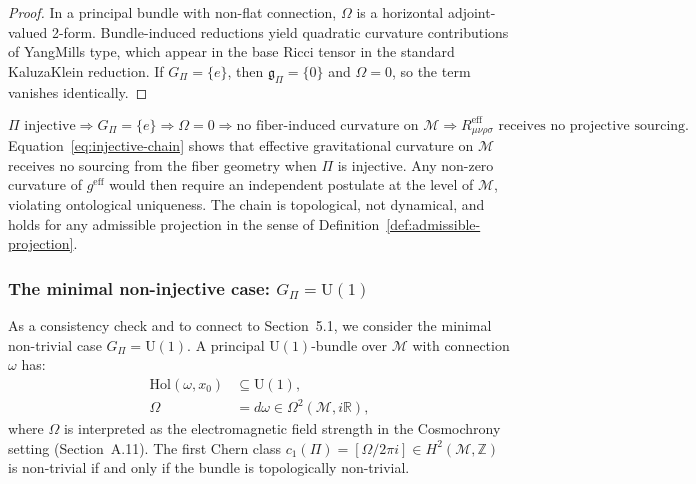     \begin{proof}
      In a principal bundle with non-flat connection, $\Omega$ is a horizontal adjoint-valued 2-form.
      Bundle-induced reductions yield quadratic curvature contributions of Yang\textendash Mills type,
      which appear in the base Ricci tensor in the standard Kaluza\textendash Klein reduction.
      If $G_\Pi = \{e\}$, then $\mathfrak{g}_\Pi = \{0\}$ and $\Omega = 0$, so the term vanishes identically.
    \end{proof}

    \begin{remark}
      \begin{equation}
        \Pi \text{ injective}
        \Rightarrow
        G_\Pi = \{e\}
        \Rightarrow
        \Omega = 0
        \Rightarrow
        \text{no fiber-induced curvature on } \mathcal{M}
        \Rightarrow
        R^\mathrm{eff}_{\mu\nu\rho\sigma}
        \text{ receives no projective sourcing.}
        \label{eq:injective-chain}
      \end{equation}
      Equation~\eqref{eq:injective-chain} shows that effective gravitational curvature on $\mathcal{M}$
      receives no sourcing from the fiber geometry when $\Pi$ is injective.
      Any non-zero curvature of $g^\mathrm{eff}$ would then require an independent postulate at the level of $\mathcal{M}$,
      violating ontological uniqueness.
      The chain is topological, not dynamical, and holds for any admissible projection in the sense of
      Definition~\ref{def:admissible-projection}.
    \end{remark}

  \subsubsection*{The minimal non-injective case: $G_\Pi = \mathrm{U}(1)$}
    \label{subsec:stepA-minimal}

    As a consistency check and to connect to Section~5.1, we consider the minimal non-trivial case $G_\Pi = \mathrm{U}(1)$.
    A principal $\mathrm{U}(1)$-bundle over $\mathcal{M}$ with connection $\omega$ has:
    \begin{align}
      \mathrm{Hol}(\omega, x_0) &\subseteq \mathrm{U}(1), \\
      \Omega &= d\omega \in \Omega^2(\mathcal{M}, i\mathbb{R}),
    \end{align}
    where $\Omega$ is interpreted as the electromagnetic field strength in the Cosmochrony setting (Section~A.11).
    The first Chern class $c_1(\Pi) = [\Omega / 2\pi i] \in H^2(\mathcal{M}, \mathbb{Z})$ is non-trivial if and only if the
    bundle is topologically non-trivial.

